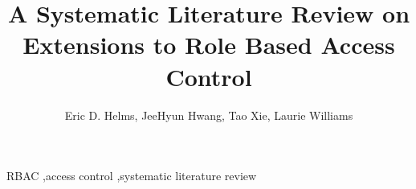 \documentclass[3p,12pt]{elsarticle}
\begin{document}
\begin{frontmatter}

\title{A Systematic Literature Review on Extensions to Role Based Access Control}
	
\author{Eric D. Helms, JeeHyun Hwang, Tao Xie, Laurie Williams}
\address{North Carolina State University}
\address{Department of Computer Science}
\address{890 Oval Drive, Box 8206}
\address{Raleigh, NC 27695-2858}




\begin{keyword}
RBAC \sep access control \sep systematic literature review
\end{keyword}

\end{frontmatter}














\end{document}
